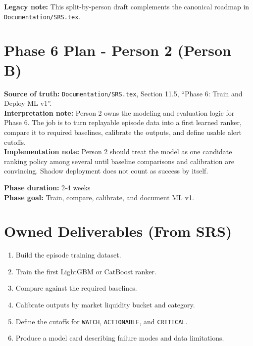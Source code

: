 \documentclass{article}
\begin{document}
\textbf{Legacy note:} This split-by-person draft complements the canonical roadmap in \texttt{Documentation/SRS.tex}.\\

\section*{Phase 6 Plan - Person 2 (Person B)}

\textbf{Source of truth:} \texttt{Documentation/SRS.tex}, Section 11.5, ``Phase 6: Train and Deploy ML v1''.\\
\textbf{Interpretation note:} Person 2 owns the modeling and evaluation logic for Phase 6. The job is to turn replayable episode data into a first learned ranker, compare it to required baselines, calibrate the outputs, and define usable alert cutoffs.\\
\textbf{Implementation note:} Person 2 should treat the model as one candidate ranking policy among several until baseline comparisons and calibration are convincing. Shadow deployment does not count as success by itself.

\textbf{Phase duration:} 2-4 weeks\\
\textbf{Phase goal:} Train, compare, calibrate, and document ML v1.

\section*{Owned Deliverables (From SRS)}
\begin{enumerate}
\item Build the episode training dataset.
\item Train the first LightGBM or CatBoost ranker.
\item Compare against the required baselines.
\item Calibrate outputs by market liquidity bucket and category.
\item Define the cutoffs for \texttt{WATCH}, \texttt{ACTIONABLE}, and \texttt{CRITICAL}.
\item Produce a model card describing failure modes and data limitations.
\end{enumerate}
\end{document}
